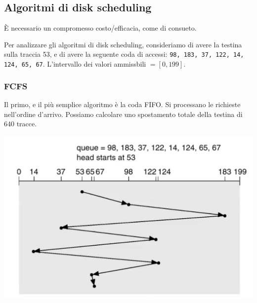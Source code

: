\documentclass[a4paper,12pt, twoside]{report}
\begin{document}
\subsection{Algoritmi di disk scheduling}

\`E necessario un compromesso costo/efficacia, come di consueto.

Per analizzare gli algoritmi di disk scheduling, consideriamo di avere la testina sulla traccia 53, e di 
avere la seguente coda di accessi: \texttt{98, 183, 37, 122, 14, 124, 65, 67}. L'intervallo dei valori 
ammissbili $= [0, 199]$.

\subsubsection{FCFS}
Il primo, e il pi\`u semplice algoritmo \`e la coda FIFO. Si processano le richieste nell'ordine d'arrivo.
Possiamo calcolare uno spostamento totale della testina di 640 tracce. 
\begin{center}
    \includegraphics[scale=0.2]{fcfs_disk}
\end{center}
\end{document}

